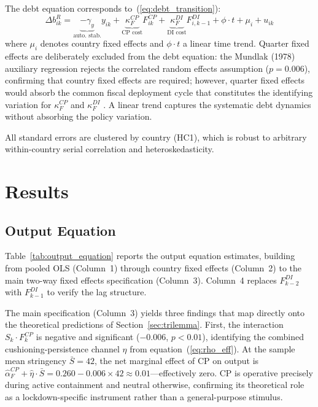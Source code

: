 The debt equation corresponds to~(\ref{eq:debt_transition}):
%
\begin{equation}
    \Delta b_{ik}^R = \underbrace{-\gamma_y}_{\text{auto. stab.}} y_{ik}
    + \underbrace{\kappa_F^{CP}}_{\text{CP cost}} F_{ik}^{CP}
    + \underbrace{\kappa_F^{DI}}_{\text{DI cost}} F_{i,k-1}^{DI}
    + \phi \cdot t + \mu_i + u_{ik}
    \label{eq:debt_est}
\end{equation}
%
where $\mu_i$ denotes country fixed effects and $\phi \cdot t$ a linear time trend. Quarter fixed effects are deliberately excluded from the debt equation: the Mundlak (1978) auxiliary regression rejects the correlated random effects assumption ($p = 0.006$), confirming that country fixed effects are required; however, quarter fixed effects would absorb the common fiscal deployment cycle that constitutes the identifying variation for $\kappa_F^{CP}$ and $\kappa_F^{DI}$ \citep{chetty2020, deb2021}. A linear trend captures the systematic debt dynamics without absorbing the policy variation.

All standard errors are clustered by country (HC1), which is robust to arbitrary within-country serial correlation and heteroskedasticity.



\section{Results}
\label{sec:results_empirical}

\subsection{Output Equation}
\label{subsec:output_results}

Table~\ref{tab:output_equation} reports the output equation estimates, building from pooled OLS (Column~1) through country fixed effects (Column~2) to the main two-way fixed effects specification (Column~3). Column~4 replaces $F_{k-2}^{DI}$ with $F_{k-1}^{DI}$ to verify the lag structure.

The main specification (Column~3) yields three findings that map directly onto the theoretical predictions of Section~\ref{sec:trilemma}. First, the interaction $S_k \cdot F_k^{CP}$ is negative and significant ($-0.006$, $p < 0.01$), identifying the combined cushioning-persistence channel $\eta$ from equation~(\ref{eq:rho_eff}). At the sample mean stringency $\bar{S} = 42$, the net marginal effect of CP on output is $\hat{\alpha}_F^{CP} + \hat{\eta} \cdot \bar{S} = 0.260 - 0.006 \times 42 \approx 0.01$---effectively zero. CP is operative precisely during active containment and neutral otherwise, confirming its theoretical role as a lockdown-specific instrument rather than a general-purpose stimulus.

